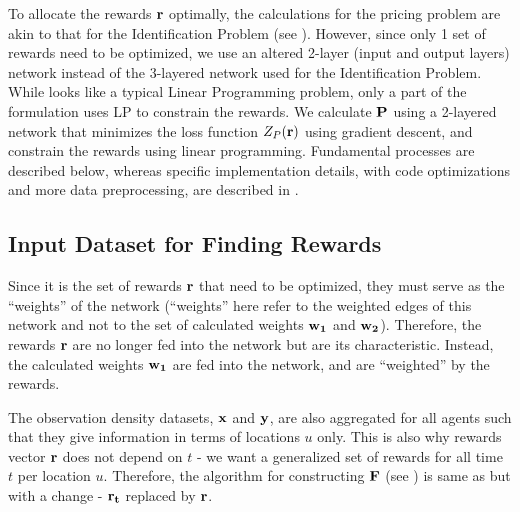 To allocate the rewards $\mathbf{r}$ optimally, the calculations for the pricing problem are akin to that for the Identification Problem (see ). However, since only 1 set of rewards need to be optimized, we use an altered 2-layer (input and output layers) network instead of the 3-layered network used for the Identification Problem. While  looks like a typical Linear Programming problem, only a part of the formulation uses LP to constrain the rewards. We calculate $\mathbf{P}$ using a 2-layered network that minimizes the loss function $Z_P(\mathbf{r})$ using gradient descent, and constrain the rewards using linear programming. Fundamental processes are described below, whereas specific implementation details, with code optimizations and more data preprocessing, are described in .

\subsection{Input Dataset for Finding Rewards}
Since it is the set of rewards $\mathbf{r}$ that need to be optimized, they must serve as the ``weights'' of the network (``weights'' here refer to the weighted edges of this network and not to the set of calculated weights $\mathbf{w_1}$ and $\mathbf{w_2}$). Therefore, the rewards $\mathbf{r}$ are no longer fed into the network but are its characteristic. Instead, the calculated weights $\mathbf{w_1}$ are fed into the network, and are ``weighted'' by the rewards.

The observation density datasets, $\mathbf{x}$ and $\mathbf{y}$, are also aggregated for all agents such that they give information in terms of locations $u$ only. This is also why rewards vector $\mathbf{r}$ does not depend on $t$ - we want a generalized set of rewards for all time $t$ per location $u$. Therefore, the algorithm for constructing $\mathbf{F}$ (see ) is same as  but with a change - $\mathbf{r_t}$ replaced by $\mathbf{r}$.

